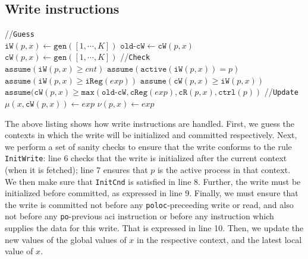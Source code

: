 \documentclass{article}
\newcommand{\var}{\texttt}
\begin{document}
\subsection{Write instructions}
\begin{algorithm}[H]
  \SetAlgoLined
  //\var{Guess}\\
  $\var{iW}(p,x) \gets \var{gen}([1,\cdots,K])$\;
  $\var{old-cW} \gets \var{cW}(p,x)$\;
  $\var{cW}(p,x) \gets \var{gen}([1,\cdots,K])$\;
  //\var{Check}\\
  $\var{assume}(\var{iW}(p,x) \geq cnt)$\;
  $\var{assume}(\var{active}(\var{iW}(p,x)) = p)$\;
  $\var{assume}(\var{iW}(p,x) \geq \var{iReg}(exp))$\;
  $\var{assume}(\var{cW}(p,x) \geq \var{iW}(p,x))$\;
  $\var{assume}(\var{cW}(p,x) \geq \var{max}(\var{old-cW},\var{cReg}(exp),\var{cR}(p,x),\var{ctrl}(p))$\;
  //\var{Update}\\
  $\mu(x,\var{cW}(p,x)) \gets exp$\;
  $\nu(p,x) \gets exp$\;
  \caption{$\llbracket x \leftarrow exp\rrbracket_K^{p,\var{Write}}$}
\end{algorithm}
The above listing shows how write instructions are handled. First, we guess the contexts in which the write will be initialized and committed respectively. Next, we perform a set of sanity checks to ensure that the write conforms to the rule \var{InitWrite}: line 6 checks that the write is initialized after the current context (when it is fetched); line 7 ensures that $p$ is the active process in that context. We then make sure that \var{InitCnd} is satisfied in line 8. Further, the write must be initialized before committed, as expressed in line 9. Finally, we must ensure that the write is committed not before any \var{poloc}-preceeding write or read, and also not before any \var{po}-previous aci instruction or before any instruction which supplies the data for this write. That is expressed in line 10. Then, we update the new values of the global values of $x$ in the respective context, and the latest local value of $x$.
\end{document}

